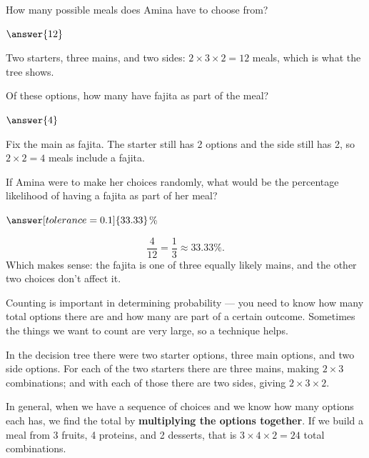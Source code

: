 \documentclass[12pt]{ximera}
\begin{document}
\begin{problem}
How many possible meals does Amina have to choose from?

$\answer{12}$

\begin{solution}
Two starters, three mains, and two sides: $2 \times 3 \times 2 = 12$ meals, which is what
the tree shows.
\end{solution}
\end{problem}

\begin{problem}
Of these options, how many have fajita as part of the meal?

$\answer{4}$

\begin{solution}
Fix the main as fajita. The starter still has 2 options and the side still has 2, so
$2 \times 2 = 4$ meals include a fajita.
\end{solution}
\end{problem}

\begin{problem}
If Amina were to make her choices randomly, what would be the percentage likelihood of
having a fajita as part of her meal?

$\answer[tolerance=0.1]{33.33}$\%

\begin{solution}
\[
\frac{4}{12} = \frac{1}{3} \approx 33.33\%.
\]
Which makes sense: the fajita is one of three equally likely mains, and the other two
choices don't affect it.
\end{solution}
\end{problem}

Counting is important in determining probability --- you need to know how many total
options there are and how many are part of a certain outcome. Sometimes the things we
want to count are very large, so a technique helps.

In the decision tree there were two starter options, three main options, and two side
options. For each of the two starters there are three mains, making $2 \times 3$
combinations; and with each of those there are two sides, giving $2 \times 3 \times 2$.

In general, when we have a sequence of choices and we know how many options each has, we
find the total by \textbf{multiplying the options together}. If we build a meal from 3
fruits, 4 proteins, and 2 desserts, that is $3 \times 4 \times 2 = 24$ total combinations.
\end{document}
